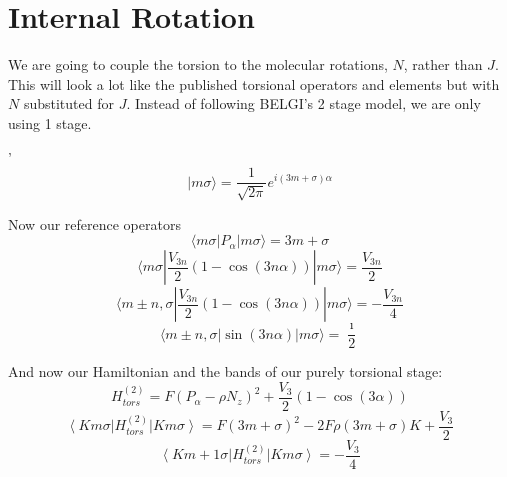 \documentclass{article}
\begin{document}
\section{Internal Rotation}
We are going to couple the torsion to the molecular rotations, $N$, rather than $J$. This will look a lot like the published torsional operators and elements but with $N$ substituted for $J$. Instead of following BELGI's 2 stage model, we are only using 1 stage.

'\begin{equation}
|m\sigma\rangle = \frac{1}{\sqrt{2\pi}}e^{i(3m+\sigma)\alpha}
\end{equation}

Now our reference operators
\begin{equation}
\langle m \sigma |P_{\alpha}|m\sigma\rangle = 3m+\sigma
\end{equation}
\begin{equation}
\langle m \sigma |\frac{V_{3n}}{2}(1-\cos (3n\alpha))| m\sigma\rangle = \frac{V_{3n}}{2}
\end{equation}
\begin{equation}
\langle m\pm n, \sigma | \frac{V_{3n}}{2}(1-\cos (3n\alpha))| m\sigma\rangle = -\frac{V_{3n}}{4}
\end{equation}
\begin{equation}
	\langle m\pm n, \sigma | \sin (3n\alpha)| m\sigma\rangle = \frac{\imath}{2}
\end{equation}

And now our Hamiltonian and the bands of our purely torsional stage:
\begin{equation}
H_{tors}^{(2)} = F(P_{\alpha}-\rho N_{z})^{2} + \frac{V_{3}}{2}(1-\cos (3\alpha))
\end{equation}
\begin{equation}
\left\langle K m\sigma\right|H_{tors}^{(2)}\left|K m\sigma\right\rangle = F(3m+\sigma)^{2} - 2F\rho(3m+\sigma)K +\frac{V_{3}}{2}
\end{equation}
\begin{equation}
\left\langle K m+1\sigma\right|H_{tors}^{(2)}\left|K m\sigma\right\rangle = -\frac{V_{3}}{4}
\end{equation}
\end{document}
